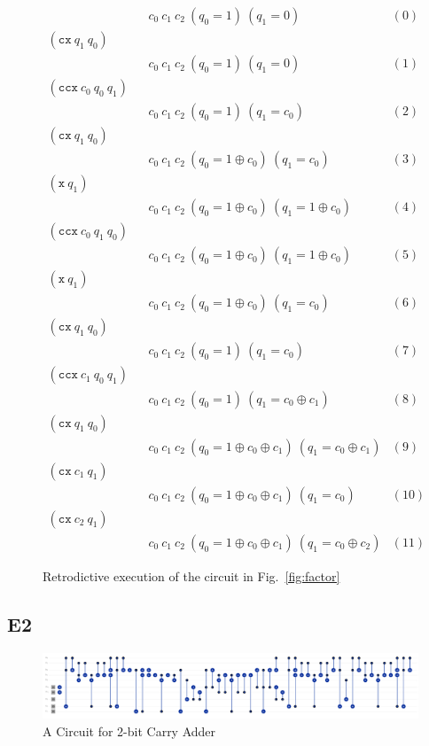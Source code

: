 \documentclass{article}
\begin{document}
\begin{figure}[t]
\[\begin{array}{lclr}
&& c_0~c_1~c_2~(q_0=1)~(q_1=0) & (0) \\
(\texttt{cx}~q_1~q_0)      \\ && c_0~c_1~c_2~(q_0=1)~(q_1=0) & (1) \\
(\texttt{ccx}~c_0~q_0~q_1) \\ && c_0~c_1~c_2~(q_0=1)~(q_1=c_0) & (2) \\
(\texttt{cx}~q_1~q_0)      \\ && c_0~c_1~c_2~(q_0=1 \oplus c_0)~(q_1=c_0) & (3) \\
(\texttt{x}~q_1)           \\ && c_0~c_1~c_2~(q_0=1 \oplus c_0)~(q_1=1 \oplus c_0) & (4) \\
(\texttt{ccx}~c_0~q_1~q_0) \\ && c_0~c_1~c_2~(q_0=1 \oplus c_0)~(q_1=1 \oplus c_0) & (5) \\
(\texttt{x}~q_1)           \\ && c_0~c_1~c_2~(q_0=1 \oplus c_0)~(q_1=c_0) & (6) \\
(\texttt{cx}~q_1~q_0)      \\ && c_0~c_1~c_2~(q_0=1)~(q_1=c_0) & (7) \\
(\texttt{ccx}~c_1~q_0~q_1) \\ && c_0~c_1~c_2~(q_0=1)~(q_1=c_0 \oplus c_1) & (8) \\
(\texttt{cx}~q_1~q_0)      \\ && c_0~c_1~c_2~(q_0=1 \oplus c_0 \oplus c_1)~(q_1=c_0 \oplus c_1) & (9) \\
(\texttt{cx}~c_1~q_1)      \\ && c_0~c_1~c_2~(q_0=1 \oplus c_0 \oplus c_1)~(q_1=c_0) & (10) \\
(\texttt{cx}~c_2~q_1)      \\ && c_0~c_1~c_2~(q_0=1 \oplus c_0 \oplus c_1)~(q_1=c_0 \oplus c_2) & (11)
\end{array}\]
\caption{Retrodictive execution of the circuit in Fig.~\ref{fig:factor}}
\label{fig:deriv}
\end{figure}

\subsection{E2}

\begin{figure}[t]
    \centering
    \includegraphics[scale=0.2]{adder.pdf}
    \caption{A Circuit for 2-bit Carry Adder}
    \label{fig:adder}
\end{figure}
\end{document}
